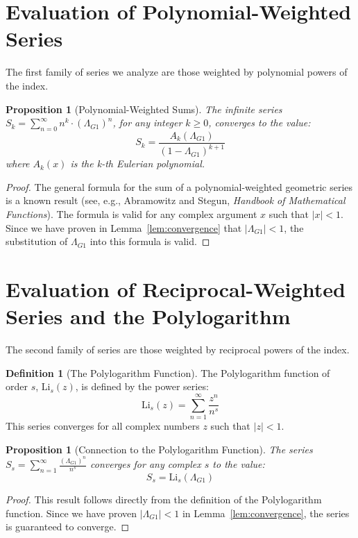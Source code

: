 \documentclass{amsart}
\theoremstyle{plain}
\newtheorem{proposition}[theorem]{Proposition}
\theoremstyle{definition}
\newtheorem{definition}[theorem]{Definition}
\theoremstyle{remark}
\newcommand{\LambdaG}{\Lambda_{G1}}
\begin{document}
\section{Evaluation of Polynomial-Weighted Series}
The first family of series we analyze are those weighted by polynomial powers of the index.

\begin{proposition}[Polynomial-Weighted Sums]
The infinite series $S_k = \sum_{n=0}^{\infty} n^k \cdot (\LambdaG)^n$, for any integer $k \ge 0$, converges to the value:
$$S_k = \frac{A_k(\LambdaG)}{(1-\LambdaG)^{k+1}}$$
where $A_k(x)$ is the k-th Eulerian polynomial.
\end{proposition}
\begin{proof}
The general formula for the sum of a polynomial-weighted geometric series is a known result (see, e.g., Abramowitz and Stegun, \textit{Handbook of Mathematical Functions}). The formula is valid for any complex argument $x$ such that $|x|<1$. Since we have proven in Lemma~\ref{lem:convergence} that $|\LambdaG|<1$, the substitution of $\LambdaG$ into this formula is valid.
\end{proof}

\section{Evaluation of Reciprocal-Weighted Series and the Polylogarithm}
The second family of series are those weighted by reciprocal powers of the index.

\begin{definition}[The Polylogarithm Function]
The Polylogarithm function of order $s$, $\mathrm{Li}_s(z)$, is defined by the power series:
$$ \mathrm{Li}_s(z) = \sum_{n=1}^{\infty} \frac{z^n}{n^s} $$
This series converges for all complex numbers $z$ such that $|z|<1$.
\end{definition}

\begin{proposition}[Connection to the Polylogarithm Function]
The series $S_s = \sum_{n=1}^{\infty} \frac{(\LambdaG)^{n}}{n^s}$ converges for any complex $s$ to the value:
$$S_s = \mathrm{Li}_s(\LambdaG)$$
\end{proposition}
\begin{proof}
This result follows directly from the definition of the Polylogarithm function. Since we have proven $|\LambdaG| < 1$ in Lemma~\ref{lem:convergence}, the series is guaranteed to converge.
\end{proof}
\end{document}
